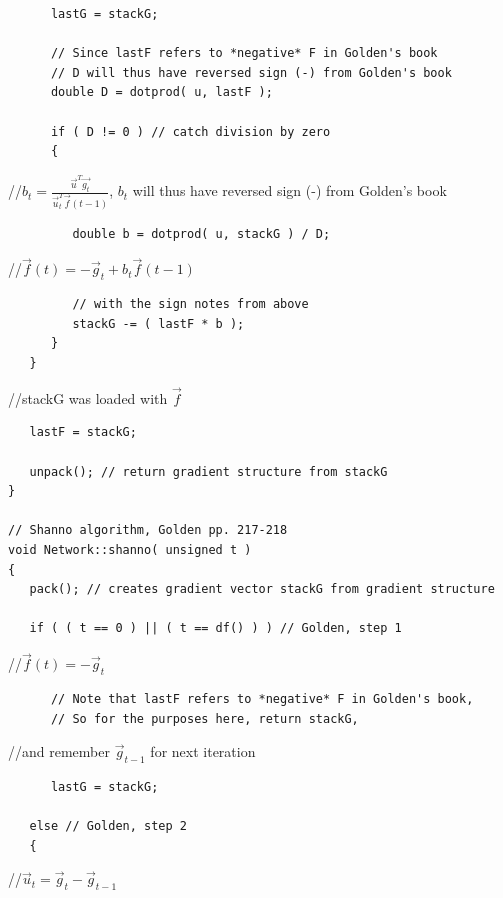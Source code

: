 \documentclass{report}[10pt]
\begin{document}
\begin{verbatim}
      lastG = stackG;

      // Since lastF refers to *negative* F in Golden's book
      // D will thus have reversed sign (-) from Golden's book
      double D = dotprod( u, lastF );

      if ( D != 0 ) // catch division by zero
      {
\end{verbatim}
\hspace{36 pt}//\hspace{4 pt}$b_t=\frac{\vec{u}^T\vec{g_t}}{\vec{u}^T_t\vec{f}(t-1)}$,
$b_t$ will thus have reversed sign (-) from Golden's book
\begin{verbatim}
         double b = dotprod( u, stackG ) / D;
\end{verbatim}
\hspace{36 pt}//\hspace{4 pt}$\vec{f}(t)=-\vec{g}_t+b_t\vec{f}(t-1)$
\begin{verbatim}
         // with the sign notes from above
         stackG -= ( lastF * b );
      }
   }

\end{verbatim}
\hspace{12 pt}//\hspace{4 pt}stackG was loaded with $\vec{f}$
\begin{verbatim}
   lastF = stackG;

   unpack(); // return gradient structure from stackG
}

// Shanno algorithm, Golden pp. 217-218
void Network::shanno( unsigned t )
{
   pack(); // creates gradient vector stackG from gradient structure

   if ( ( t == 0 ) || ( t == df() ) ) // Golden, step 1
\end{verbatim}
\hspace{24 pt}//\hspace{4 pt}$\vec{f}(t)=-\vec{g}_t$
\begin{verbatim}
      // Note that lastF refers to *negative* F in Golden's book,
      // So for the purposes here, return stackG,
\end{verbatim}
\hspace{24 pt}//\hspace{4 pt}and remember $\vec{g}_{t-1}$ for next iteration
\begin{verbatim}
      lastG = stackG;

   else // Golden, step 2
   {
\end{verbatim}
\hspace{24 pt}//\hspace{4 pt}$\vec{u}_t=\vec{g}_t-\vec{g}_{t-1}$
\end{document}
